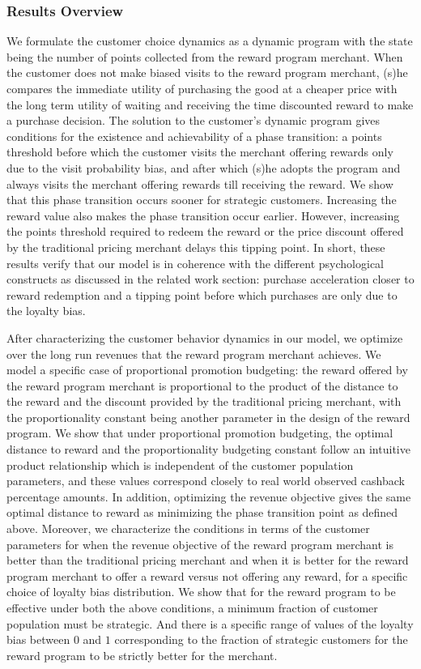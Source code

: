 \subsubsection{Results Overview}
We formulate the customer choice dynamics as a dynamic program with the state being the number of points collected from the reward program merchant.
When the customer does not make biased visits to the reward program merchant, (s)he compares the immediate utility of purchasing the good at a cheaper price with the long term utility of waiting and receiving the time discounted reward to make a purchase decision. 
The solution to the customer's dynamic program gives conditions for the existence and achievability of a phase transition: a points threshold before which the customer visits the merchant offering rewards only due to the visit probability bias, and after which (s)he adopts the program and always visits the merchant offering rewards till receiving the reward.
We show that this phase transition occurs sooner for strategic customers. Increasing the reward value also makes the phase transition occur earlier.
However, increasing the points threshold required to redeem the reward or the price discount offered by the traditional pricing merchant delays this tipping point.
In short, these results verify that our model is in coherence with the different psychological constructs as discussed in the related work section: purchase acceleration closer to reward redemption and a tipping point before which purchases are only due to the loyalty bias.

After characterizing the customer behavior dynamics in our model, we optimize over the long run revenues that the reward program merchant achieves.
We model a specific case of proportional promotion budgeting: the reward offered by the reward program merchant is proportional to the product of the distance to the reward and the discount provided by the traditional pricing merchant, with the proportionality constant being another parameter in the design of the reward program.
We show that under proportional promotion budgeting, the optimal distance to reward and the proportionality budgeting constant follow an intuitive product relationship which is independent of the customer population parameters,
and these values correspond closely to real world observed cashback percentage amounts.
In addition, optimizing the revenue objective gives the same optimal distance to reward as minimizing the phase transition point as defined above.
Moreover, we characterize the conditions in terms of the customer parameters for when the revenue objective of the reward program merchant is better than the traditional pricing merchant and when it is better for the reward program merchant to offer a reward versus not offering any reward, for a specific choice of loyalty bias distribution.
We show that for the reward program to be effective under both the above conditions, a minimum fraction of customer population must be strategic.
And there is a specific range of values of the loyalty bias between $0$ and $1$ corresponding to the fraction of strategic customers for the reward program to be strictly better for the merchant. 

